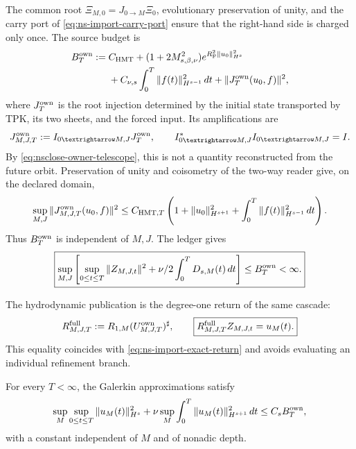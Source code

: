 The common root \(\Xi_{M,0}=J_{0\to M}\Xi_0\), evolutionary preservation of unity, and the carry port of \eqref{eq:ns-import-carry-port} ensure that the right-hand side is charged only once. The source budget is
\begin{equation}
 \begin{aligned}
 \mathcal B_T^{\rm own}:={}&
 C_{\rm HMT}
 +(1+2\widetilde M_{s,\beta,\nu}^2)
  e^{R_{\rm F}^2\|u_0\|_{H^s}^2}\\
 &+C_{\nu,s}\int_0^T\|f(t)\|_{H^{s-1}}^2\,dt
 +\|\mathcal J_T^{\rm own}(u_0,f)\|^2 ,
 \end{aligned}
 \label{eq:nsclose-owner-data-budget}
\end{equation}
where \(\mathcal J_T^{\rm own}\) is the root injection determined by the initial state transported by TPK, its two sheets, and the forced input. Its amplifications are
\[
 \mathcal J_{M,J,T}^{\rm own}
 :=I_{0\to M,J}\mathcal J_T^{\rm own},
 \qquad I_{0\to M,J}^*I_{0\to M,J}=I.
\]
By \eqref{eq:nsclose-owner-telescope}, this is not a quantity reconstructed from the future orbit. Preservation of unity and coisometry of the two-way reader give, on the declared domain,
\begin{equation}
 \sup_{M,J}\|\mathcal J_{M,J,T}^{\rm own}(u_0,f)\|^2
 \le C_{{\rm HMT},T}
 \left(1+\|u_0\|_{H^{s+1}}^2
 +\int_0^T\|f(t)\|_{H^{s-1}}^2\,dt\right).
 \label{eq:nsclose-owner-root-uniformity}
\end{equation}
Thus \(\mathcal B_T^{\rm own}\) is independent of \(M,J\). The ledger gives
\begin{equation}
 \boxed{
 \sup_{M,J}\left[
  \sup_{0\le t\le T}\|Z_{M,J,t}\|^2
  +\frac\nu2\int_0^TD_{s,M}(t)\,dt
 \right]\le\mathcal B_T^{\rm own}<\infty.}
 \label{eq:nsclose-proprietary-uniform-budget}
\end{equation}

The hydrodynamic publication is the degree-one return of the same cascade:
\begin{equation}
 R_{M,J,T}^{\rm full}
 :=\mathcal R_{1,M}
   (\mathfrak U_{M,J,T}^{\rm own})^{\sharp},
 \qquad
 \boxed{
 R_{M,J,T}^{\rm full}Z_{M,J,t}=u_M(t).}
 \label{eq:nsclose-proprietary-exact-return}
\end{equation}
\label{eq:nsclose-exact-full-return}
This equality coincides with \eqref{eq:ns-import-exact-return} and avoids evaluating an individual refinement branch.

\begin{theorem}
\label{thm:nsclose-proprietary-full}
For every \(T<\infty\), the Galerkin approximations satisfy
\begin{equation}
 \sup_M\sup_{0\le t\le T}\|u_M(t)\|_{H^s}^2
 +\nu\sup_M\int_0^T\|u_M(t)\|_{H^{s+1}}^2\,dt
 \le C_s\mathcal B_T^{\rm own},
 \label{eq:nsclose-uniform-sobolev-precompactness}
\end{equation}
\label{eq:nsclose-uniform-sobolev}
with a constant independent of \(M\) and of nonadic depth.
\end{theorem}

